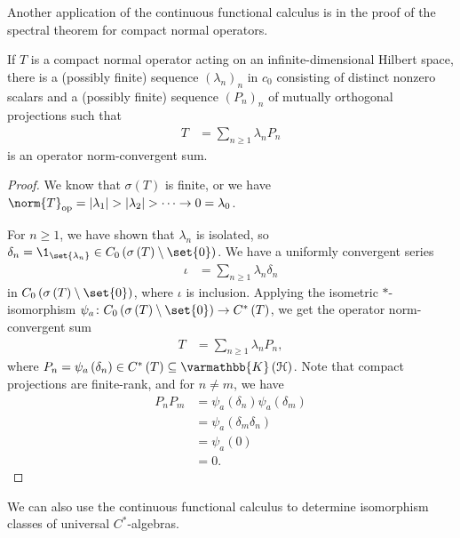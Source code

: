 \documentclass[10pt]{mypackage}
\renewcommand*{\mathbb}[1]{\varmathbb{#1}}
\newcommand{\K}{\mathbb{K}}
\DeclareMathOperator{\op}{op}
\begin{document}
Another application of the continuous functional calculus is in the proof of the spectral theorem for compact normal operators.
\begin{theorem}
  If $T$ is a compact normal operator acting on an infinite-dimensional Hilbert space, there is a (possibly finite) sequence $\left(\lambda_n\right)_n$ in $c_0$ consisting of distinct nonzero scalars and a (possibly finite) sequence $\left(P_n\right)_n$ of mutually orthogonal projections such that
  \begin{align*}
    T &= \sum_{n\geq 1}\lambda_nP_n
  \end{align*}
  is an operator norm-convergent sum.
\end{theorem}
\begin{proof}
  We know that $\sigma(T)$ is finite, or we have $\norm{T}_{\op} = \left\vert \lambda_1 \right\vert > \left\vert \lambda_2 \right\vert > \cdots \rightarrow 0 = \lambda_0$.\newline

  For $n\geq 1$, we have shown that $\lambda_n$ is isolated, so $\delta_n = \1_{\set{\lambda_n}}\in C_0\left(\sigma\left(T\right)\setminus \set{0}\right)$. We have a uniformly convergent series
  \begin{align*}
    \iota &= \sum_{n\geq 1}\lambda_n\delta_n
  \end{align*}
  in $C_0\left(\sigma\left(T\right)\setminus \set{0}\right)$, where $\iota$ is inclusion. Applying the isometric $\ast$-isomorphism $\psi_a\colon C_0\left(\sigma\left(T\right)\setminus \set{0}\right)\rightarrow C^{\ast}\left(T\right)$, we get the operator norm-convergent sum
  \begin{align*}
    T &= \sum_{n\geq 1}\lambda_nP_n,
  \end{align*}
  where $P_n = \psi_a\left(\delta_n\right)\in C^{\ast}\left(T\right)\subseteq \K\left(\mathcal{H}\right)$. Note that compact projections are finite-rank, and for $n\neq m$, we have
  \begin{align*}
    P_nP_m &= \psi_a\left(\delta_n\right)\psi_a\left(\delta_m\right)\\
           &= \psi_a\left(\delta_{m}\delta_n\right)\\
           &= \psi_a\left(0\right)\\
           &= 0.
  \end{align*}
\end{proof}
We can also use the continuous functional calculus to determine isomorphism classes of universal $C^{\ast}$-algebras.
\end{document}
